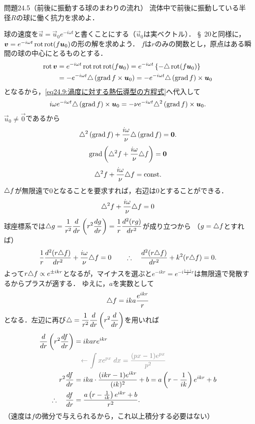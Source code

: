 
\begin{mondai}{}{問題24.5（前後に振動する球のまわりの流れ）}
流体中で前後に振動している半径$R$の球に働く抗力を求めよ．
\end{mondai}
\begin{kaitou}
球の速度を$\vec{u} = \vec{u}_0 e^{-i\omega t}$と書くことにする（$\vec{u}_0$は実ベクトル）．
\S~20と同様に，$\vb*{v} = e^{-i\omega t} \operatorname{rot}\operatorname{rot}(f\vb*{u}_0)$の形の解を求めよう．
$f$は$r$のみの関数とし，原点はある瞬間の球の中心にとるものとする．
\begin{align*}
    \operatorname{rot}\vb*{v} &= e^{-i\omega t} \operatorname{rot}\operatorname{rot}\operatorname{rot}(f\vb*{u}_0) = e^{-i\omega t} \left\{ -\triangle \operatorname{rot}(f\vb*{u}_0) \right\} \\
    &= -e^{-i\omega t} \triangle \left( \operatorname{grad} f \times \vb*{u}_0 \right) = -e^{-i\omega t} \triangle \left( \operatorname{grad} f \right) \times \vb*{u}_0
\end{align*}
となるから，\eqref{eq24.9:渦度に対する熱伝導型の方程式}へ代入して
\[
    i\omega e^{-i\omega t} \triangle \left( \operatorname{grad} f \right) \times \vb*{u}_0
    = -\nu e^{-i\omega t} \triangle^2 \left( \operatorname{grad} f \right) \times \vb*{u}_0.
\]
$\vec{u}_0 \neq \vec{0}$であるから
\[
    \triangle^2 \left( \operatorname{grad} f \right) + \frac{i\omega}{\nu} \triangle \left( \operatorname{grad} f \right) = \vb*{0}.
\]
\[
    \operatorname{grad}\left( \triangle^2 f + \frac{i\omega}{\nu} \triangle f \right)  = \vb*{0}
\]
\[
    \triangle^2 f + \frac{i\omega}{\nu} \triangle f = \mathrm{const.}
\]
$\triangle f$が無限遠で0となることを要求すれば，右辺は0とすることができる．
\[
    \triangle^2 f + \frac{i\omega}{\nu} \triangle f = 0
\]
球座標系では$\Laplacian g = \dfrac{1}{r^2} \ddv{r} \left( r^2 \ddv{g}{r} \right) = \dfrac{1}{r} \ddv[2]{(rg)}{r}$が成り立つから
（$g=\triangle f$とすれば）
\[
    \frac{1}{r} \dv[2]{(r\triangle f)}{r} + \frac{i\omega}{\nu} \triangle f = 0
    \qquad \therefore\quad 
    \dv[2]{(r\triangle f)}{r} + k^2 (r\triangle f) = 0.
\]
よって$r\triangle f \propto e^{\pm ikr}$となるが，マイナスを選ぶと$e^{-ikr} = e^{-i\frac{1+i}{\delta}r}$は無限遠で発散するからプラスが適する．
ゆえに，$a$を実数として
\[
    \triangle f = ika \frac{e^{ikr}}{r}
\]
となる．左辺に再び$\Laplacian = \dfrac{1}{r^2} \ddv{r} \left( r^2 \ddv{r} \right)$を用いれば
\begin{align*}
    \dv{r} \left( r^2 \dv{f}{r} \right) &= ik ar e^{ikr} \\
    & \gyoukan{← $\displaystyle\int x e^{px} \; dx = \frac{(px-1)e^{px}}{p^2}$ } \\
    r^2 \dv{f}{r} &= ika \cdot \frac{(ikr-1)e^{ikr}}{(ik)^2} + b = a \left( r - \frac{1}{ik} \right) e^{ikr} + b \\
    \yueni \dv{f}{r} &= \frac{ a \left( r - \frac{1}{ik} \right) e^{ikr} + b }{r^2} .
\end{align*}
（速度は$f$の微分で与えられるから，これ以上積分する必要はない）


\end{kaitou}
